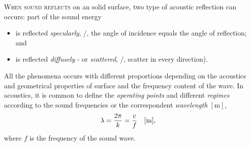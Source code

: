 \textsc{When sound reflects} on an solid surface, two type of acoustic reflection can occurs: part of the sound energy
\begin{itemize}
    \item is reflected \textit{specularly}, \ie/, the angle of incidence equals the angle of reflection; and
    \item is reflected \textit{diffusely} - or \textit{scattered}, \ie/, scatter in every direction).
\end{itemize}

All the phenomena occurs with different proportions depending on the acoustics and geometrical properties of surface and the frequency content of the wave.
In acoustics, it is common to define the \textit{operating points} and different \textit{regimes}
according to the sound frequencies or the correspondent \textit{wavelength} $[\si{\metre}]$,
\begin{equation}
    \lambda = \frac{2 \pi}{k} = \frac{c}{f} \hspace{1em} [\si{\metre}]
    ,
\end{equation}
where $f$ is the frequency of the sound wave.

